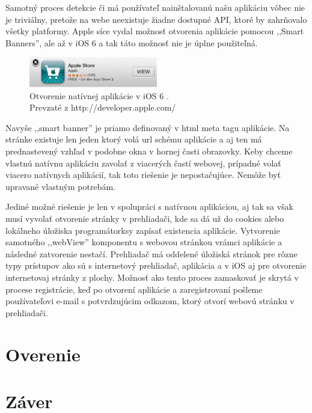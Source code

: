 Samotný proces detekcie či má používateľ nainštalovanú našu aplikáciu vôbec nie je triviálny, pretože na webe neexistuje žiadne dostupné API, ktoré by zahrňovalo všetky platformy. Apple síce vydal možnosť otvorenia aplikácie pomocou ,,Smart Banners'', ale až v iOS 6 a tak táto možnosť nie je úplne použiteľná.

\begin{figure}[H]
	\centering
	\includegraphics[width=0.5\textwidth]{img/smartappbanner.png}
	\caption[Otvorenie natívnej aplikácie v iOS 6]{
		Otvorenie natívnej aplikácie v iOS 6 \cite{smartappbanner}.\\
		Prevzaté z http://developer.apple.com/}
	\label{fig: smartappbanner}
\end{figure}

Navyše ,,smart banner'' je priamo definovaný v html meta tagu aplikácie. Na stránke existuje len jeden ktorý volá url schému aplikácie a aj ten má prednastevený vzhľad v podobne okna v hornej časti obrazovky. Keby chceme vlastnú natívnu aplikáciu zavolať z viacerých častí webovej, prípadné volať viacero natívnych aplikácií, tak toto riešenie je nepostačujúce. Nemôže byť upravané vlastným potrebám.

Jediné možné riešenie je len v spolupráci s natívnou aplikáciou, aj tak sa však musí vyvolať otvorenie stránky v prehliadači, kde sa dá už do cookies alebo lokálneho úložiska programátorksy zapísať existencia aplikácie. Vytvorenie samotného ,,webView'' komponentu s webovou stránkou vrámci aplikácie a následné zatvorenie nestačí. Prehliadač má oddelené úložiská stránok pre rôzne typy prístupov ako sú s internetový prehliadač, aplikácia a v iOS aj pre otvorenie internetovaj stránky z plochy. Možnosť ako tento proces zamaskovať je skrytá v procese registrácie, keď po otvorení aplikácie a zaregistrovaní pošleme používateľovi e-mail s potvrdzujúcim odkazom, ktorý otvorí webovú stránku v prehliadači.





\section{Overenie} %
\label{sec:overenie}


\section{Záver} %
\label{sec:z_ver}

